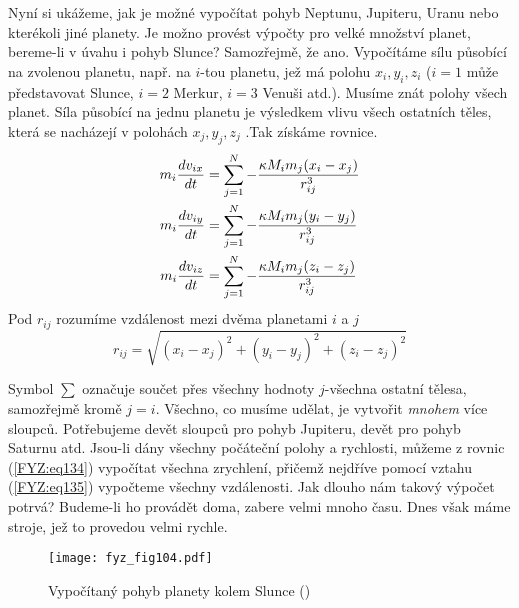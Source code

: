 {{    Nyní si ukážeme, jak je možné vypočítat pohyb Neptunu, Jupiteru, Uranu nebo kterékoli jiné 
    planety. Je možno provést výpočty pro velké množství planet, bereme-li v úvahu i pohyb Slunce? 
    Samozřejmě, že ano. Vypočítáme sílu působící na zvolenou planetu, např. na \(i\)-tou planetu, 
    jež má polohu \(x_i, y_i, z_i\) (\(i = 1\) může představovat Slunce, \(i = 2\) Merkur, \(i = 
    3\) Venuši atd.). Musíme znát polohy všech planet. Síla působící na jednu planetu je výsledkem 
    vlivu všech ostatních těles, která se nacházejí v polohách \(x_j, y_j, z_j\) .Tak získáme 
    rovnice.
    \begin{subequations}
      \label{FYZ:eq134}
      \begin{align}
        m_i\frac{d v_{ix}}{d t} 
          &= \sum_{j=1}^N - \frac{\kappa M_im_j(x_i - x_j)}{r_{ij}^3}  \label{FYZ:eq134a}  \\
        m_i\frac{d v_{iy}}{d t} 
          &= \sum_{j=1}^N - \frac{\kappa M_im_j(y_i - y_j)}{r_{ij}^3}  \label{FYZ:eq134b}  \\
        m_i\frac{d v_{iz}}{d t} 
          &= \sum_{j=1}^N - \frac{\kappa M_im_j(z_i - z_j)}{r_{ij}^3}  \label{FYZ:eq134c}  
      \end{align}
    \end{subequations}
    Pod \(r_{ij}\) rozumíme vzdálenost mezi dvěma planetami \(i\) a \(j\)
    \begin{equation}\label{FYZ:eq135}
      r_{ij} = \sqrt{(x_i-x_j)^2 + (y_i-y_j)^2 + (z_i-z_j)^2}
    \end{equation}
    
    Symbol \(\sum\) označuje součet přes všechny hodnoty \(j\)-všechna ostatní tělesa, samozřejmě 
    kromě \(j = i\). Všechno, co musíme udělat, je vytvořit \emph{mnohem} více sloupců. Potřebujeme 
    devět sloupců pro pohyb Jupiteru, devět pro pohyb Saturnu atd. Jsou-li dány všechny počáteční 
    polohy a rychlosti, můžeme z rovnic (\ref{FYZ:eq134}) vypočítat všechna zrychlení, přičemž 
    nejdříve pomocí vztahu (\ref{FYZ:eq135}) vypočteme všechny vzdálenosti. Jak dlouho nám takový 
    výpočet potrvá? Budeme-li ho provádět doma, zabere velmi mnoho času. Dnes však máme stroje, jež 
    to provedou velmi rychle.
    
    \begin{figure}[ht!]  %
      \centering
      \texttt{[image: fyz\_fig104.pdf]}
      \caption{Vypočítaný pohyb planety kolem Slunce (\cite[s.~134]{Feynman01})}
      \label{fyz:fig104}
    \end{figure}
    
}}
